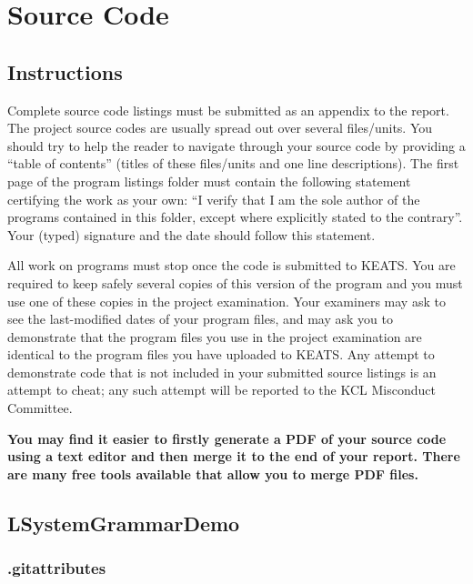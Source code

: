 \chapter{Source Code} \label{Code}

\section{Instructions}
Complete source code listings must be submitted as an appendix to the report. The project source codes are usually spread out over several files/units. You should try to help the reader to navigate through your source code by providing a ``table of contents'' (titles of these files/units and one line descriptions). The first page of the program listings folder must contain the following statement certifying the work as your own: ``I verify that I am the sole author of the programs contained in this folder, except where explicitly stated to the contrary''. Your (typed) signature and the date should follow this statement.

All work on programs must stop once the code is submitted to KEATS. You are required to keep safely several copies of this version of the program and you must use one of these copies in the project examination. Your examiners may ask to see the last-modified dates of your program files, and may ask you to demonstrate that the program files you use in the project examination are identical to the program files you have uploaded to KEATS. Any attempt to demonstrate code that is not included in your submitted source listings is an attempt to cheat; any such attempt will be reported to the KCL Misconduct Committee.

\textbf{You may find it easier to firstly generate a PDF of your source code using a text editor and then merge it to the end of your report. There are many free tools available that allow you to merge PDF files.}


\section{LSystemGrammarDemo}

\subsection{.gitattributes}

